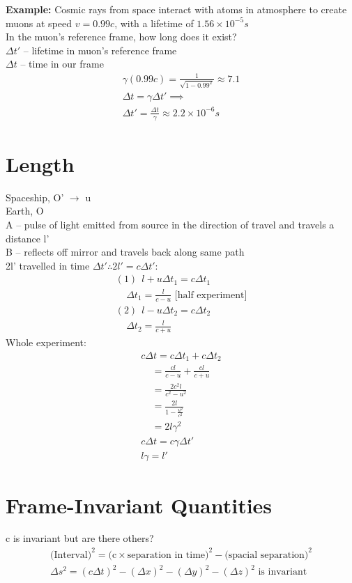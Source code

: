 \documentclass[a4paper, 11pt, fleqn, normalem]{report}
\begin{document}
\textbf{Example:} Cosmic rays from space interact with atoms in atmosphere to create muons at speed $v = 0.99c$, with a lifetime of $1.56\times10^{-5}s$ \\
In the muon's reference frame, how long does it exist? \\
$\Delta t'$ -- lifetime in muon's reference frame \\
$\Delta t$ -- time in our frame
\begin{gather*}
    \gamma(0.99c) = \frac{1}{\sqrt{1 - 0.99^{2}}} \approx 7.1 \\
    \Delta t = \gamma\Delta t' \implies \\
    \Delta t' = \frac{\Delta t}{\gamma} \approx 2.2\times10^{-6}s
\end{gather*}

\section{Length}
Spaceship, O' $\rightarrow$ u \\
Earth, O \\
A -- pulse of light emitted from source in the direction of travel and travels a distance l' \\
B -- reflects off mirror and travels back along same path \\
2l' travelled in time $\Delta t' \therefore 2l' = c\Delta t'$:
\begin{gather*}
    (1)~~l + u\Delta t_{1} = c\Delta t_{1} \\
    ~~~~~\Delta t_{1} = \frac{l}{c - u} \text{ [half experiment]} \\
    (2)~~l - u\Delta t_{2} = c\Delta t_{2} \\
    ~~~~~\Delta t_{2} = \frac{l}{c + u}
\end{gather*}
Whole experiment:
\begin{gather*}
    c\Delta t = c\Delta t_{1} + c\Delta t_{2} \\
    ~~~~~ = \frac{cl}{c - u} + \frac{cl}{c + u} \\
    ~~~~~ = \frac{2c^{2}l}{c^{2} - u^{2}} \\
    ~~~~~ = \frac{2l}{1 - \tfrac{u^{2}}{c^{2}}} \\
    ~~~~~ = 2l\gamma^{2} \\
    c\Delta t = c\gamma\Delta t' \\
    l\gamma = l'
\end{gather*}

\section{Frame-Invariant Quantities}
c is invariant but are there others?
\begin{gather*}
    \text{(Interval)}^{2} = \text{(c}\times\text{separation in time)}^{2} - \text{(spacial separation)}^{2} \\
    \Delta s^{2} = (c\Delta t)^{2} - (\Delta x)^{2} - (\Delta y)^{2} - (\Delta z)^{2}\text{ is invariant}
\end{gather*}
\end{document}
